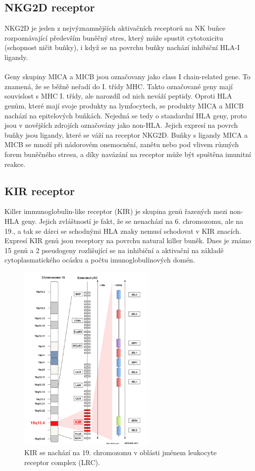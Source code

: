 \documentclass[czech,DP]{thesiskiv}
\numberwithin{equation}{section}
\begin{document}
\subsection{NKG2D receptor}
NKG2D je jeden z nejvýznamnějších aktivačních receptorů na NK buňce rozpoznávající především buněčný stres, který může spustit cytotoxicitu (schopnost ničit buňky), i když se na povrchu buňky nachází inhibiční HLA-I ligandy.  
\\
\\
Geny skupiny MICA a MICB jsou označovany jako class I chain-related gene. To znamená, že se běžně neřadí do I. třídy MHC. Takto označované geny mají souvislost s MHC I. třídy, ale narozdíl od nich neváží peptidy. Oproti HLA genům, které mají svoje produkty na lymfocytech, se produkty MICA a MICB nachází na epitelových buňkách. Nejedná se tedy o standardní HLA geny, proto jsou v novějších zdrojích označovány jako non-HLA. Jejich expresí na povrch buňky jsou ligandy, které se váží na receptor NKG2D. Buňky s ligandy MICA a MICB se množí při nádorovém onemocnění, zanětu nebo pod vlivem různých forem buněčného stresu, a díky navázání na receptor může být spuštěna imunitní reakce. \cite{transfuzni_lekarstvi} \cite{MIC} \cite{NK_receptors} \cite{imgt_hla_database}


\subsection{KIR receptor}
Killer immunoglobulin-like receptor (KIR) je skupina genů řazených mezi non-HLA geny. Jejich zvláštností je fakt, že se nenachází na 6. chromozomu, ale na 19., a tak se dárci se schodnými HLA znaky nemusí schodovat v KIR znacích. Expresí KIR genů jsou receptory na povrchu natural killer buněk. Dnes je známo 15 genů a 2 pseudogeny rozlišující se na inhibiční a aktivační na základě cytoplasmatického ocásku a počtu imunoglobulínových domén. \citep{KIR_transplantace_jindra}

\begin{figure}[H]		
		\centering
		\includegraphics[width=250px]{./img/kir_pozice.png}
		\caption{KIR se nachází na 19. chromozomu v oblásti jménem leukocyte receptor complex (LRC). \cite{imgt_hla_database}}
		\label{fig:kir_position}
\end{figure}
\end{document}
